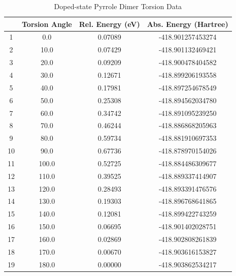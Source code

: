 \begin{table}[hbt!]\centering
\caption{Doped-state Pyrrole Dimer Torsion Data}
\renewcommand{\arraystretch}{1.5}
\begin{threeparttable}
\begin{tabular}{cccc}\toprule
  {} & {Torsion Angle} & {Rel. Energy (eV)} & {Abs. Energy (Hartree)} \\ \midrule
    1  & 0.0   & 0.07089 & -418.901257453274\\
    2  & 10.0  & 0.07429 & -418.901132469421\\
    3  & 20.0  & 0.09209 & -418.900478404582\\
    4  & 30.0  & 0.12671 & -418.899206193558\\ \midrule
    5  & 40.0  & 0.17981 & -418.897254678549\\
    6  & 50.0  & 0.25308 & -418.894562034780\\
    7  & 60.0  & 0.34742 & -418.891095239250\\
    8  & 70.0  & 0.46244 & -418.886868205963\\ \midrule
    9  & 80.0  & 0.59734 & -418.881910697353\\
    10 & 90.0  & 0.67736 & -418.878970154026\\
    11 & 100.0 & 0.52725 & -418.884486309677\\
    12 & 110.0 & 0.39525 & -418.889337414907\\ \midrule
    13 & 120.0 & 0.28493 & -418.893391476576\\
    14 & 130.0 & 0.19303 & -418.896768641865\\
    15 & 140.0 & 0.12081 & -418.899422743259\\
    16 & 150.0 & 0.06695 & -418.901402028751\\ \midrule
    17 & 160.0 & 0.02869 & -418.902808261839\\
    18 & 170.0 & 0.00670 & -418.903616153827\\
    19 & 180.0 & 0.00000 & -418.903862534217\\ \bottomrule
\end{tabular}
\begin{tablenotes}
\item
\end{tablenotes}
\end{threeparttable}
\end{table}

